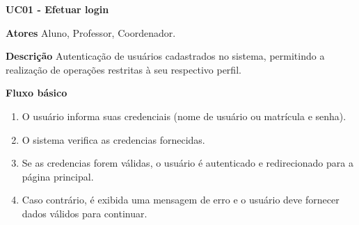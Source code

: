 \begin{description}

        
        
    \item \textbf{UC01 - Efetuar login}
        \begin{description}
            \item \textbf{Atores} Aluno, Professor, Coordenador.
            \item \textbf{Descrição} Autenticação de usuários cadastrados no sistema, permitindo a realização de operações restritas à seu respectivo perfil.
            \item \textbf{Fluxo básico}
            \begin{enumerate}
                \item O usuário informa suas credenciais (nome de usuário ou matrícula e senha).
                \item O sistema verifica as credencias fornecidas.
                \item Se as credencias forem válidas, o usuário é autenticado e redirecionado para a página principal.
                \item Caso contrário, é exibida uma mensagem de erro e o usuário deve fornecer dados válidos para continuar.
            \end{enumerate}
        \end{description}


\end{description}
